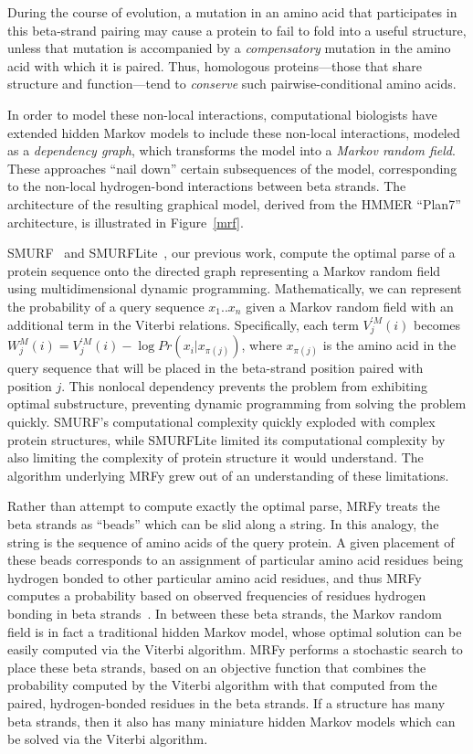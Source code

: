 \documentclass[preprint,nonatbib,blockstyle,nocopyrightspace,times]{sigplanconf}
\let\cite\citep
\begin{document}
During the course of evolution, a mutation in an amino acid that participates
in this beta-strand pairing may cause a protein to fail to fold into a useful
structure, unless that mutation is accompanied by a \textit{compensatory}
mutation in the amino acid with which it is paired. 
Thus, homologous
proteins---those that share structure and function---tend to \textit{conserve}
such pairwise-conditional amino acids.

In order to model these non-local interactions, computational biologists
have extended hidden Markov models to include these non-local interactions,
modeled as a \textit{dependency graph}, which transforms the model into a
\textit{Markov random field}. These approaches ``nail down'' 
certain subsequences of the model, corresponding to the non-local hydrogen-bond 
interactions between beta strands.
The architecture of the 
resulting graphical model, derived from the HMMER ``Plan7'' architecture, is 
illustrated in Figure~\ref{mrf}.

SMURF~\cite{Menke:2010ti} and SMURFLite~\cite{Daniels:2012}, our previous work,
compute the 
optimal parse of a protein sequence onto the directed graph representing a 
Markov random field using multidimensional dynamic programming.
Mathematically, we can represent the probability of a query sequence 
$x_{1}..x_{n}$ given a Markov random field with an additional term in the
Viterbi relations.
Specifically, each term $V_{j}^{\prime M}(i)$ becomes
$W_{j}^{M}(i) = V_{j}^{\prime M}(i) - \log Pr(x_{i} | x_{\pi(j)})$, where
$x_{\pi(j)}$ is the amino acid in the query sequence that will be placed
in the beta-strand position paired with position $j$.
This nonlocal dependency prevents the problem from exhibiting optimal substructure,
preventing dynamic programming from solving the problem quickly.
SMURF's 
computational complexity quickly exploded with complex protein structures, 
while SMURFLite limited its computational complexity by also limiting the 
complexity of protein structure it would understand.
The algorithm underlying 
MRFy grew out of an understanding of these limitations.


Rather than attempt to compute exactly the optimal parse, MRFy treats the beta 
strands as ``beads'' which can be slid along a string.
In this analogy, the 
string is the sequence of amino acids of the query protein.
A given placement 
of these beads corresponds to an assignment of particular amino acid residues 
being hydrogen bonded to other particular amino acid residues, and thus MRFy 
computes a probability based on observed frequencies of residues hydrogen 
bonding in beta strands~\cite{Cowen:2002p588}.
In between these beta strands, the 
Markov random field is in fact a traditional hidden Markov model, whose optimal 
solution can be easily computed via the Viterbi algorithm.
MRFy performs a 
stochastic search to place these beta strands, based on an objective function 
that combines the probability computed by the Viterbi algorithm with that 
computed from the paired, hydrogen-bonded residues in the beta strands.
If a 
structure has many beta strands, then it also has many miniature hidden Markov 
models which can be solved via the Viterbi algorithm.
\end{document}
